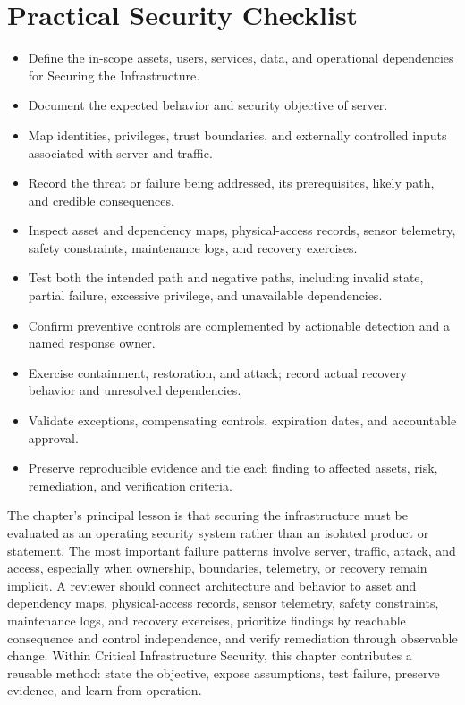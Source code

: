 \documentclass[11pt]{article}
\begin{document}
\section*{Practical Security Checklist}
\begin{itemize}[label=$\square$]
\item Define the in-scope assets, users, services, data, and operational dependencies for Securing the Infrastructure.
\item Document the expected behavior and security objective of server.
\item Map identities, privileges, trust boundaries, and externally controlled inputs associated with server and traffic.
\item Record the threat or failure being addressed, its prerequisites, likely path, and credible consequences.
\item Inspect asset and dependency maps, physical-access records, sensor telemetry, safety constraints, maintenance logs, and recovery exercises.
\item Test both the intended path and negative paths, including invalid state, partial failure, excessive privilege, and unavailable dependencies.
\item Confirm preventive controls are complemented by actionable detection and a named response owner.
\item Exercise containment, restoration, and attack; record actual recovery behavior and unresolved dependencies.
\item Validate exceptions, compensating controls, expiration dates, and accountable approval.
\item Preserve reproducible evidence and tie each finding to affected assets, risk, remediation, and verification criteria.
\end{itemize}
\begin{synthesisbox}
The chapter's principal lesson is that securing the infrastructure must be evaluated as an operating security system rather than an isolated product or statement. The most important failure patterns involve server, traffic, attack, and access, especially when ownership, boundaries, telemetry, or recovery remain implicit. A reviewer should connect architecture and behavior to asset and dependency maps, physical-access records, sensor telemetry, safety constraints, maintenance logs, and recovery exercises, prioritize findings by reachable consequence and control independence, and verify remediation through observable change. Within Critical Infrastructure Security, this chapter contributes a reusable method: state the objective, expose assumptions, test failure, preserve evidence, and learn from operation.
\end{synthesisbox}
\end{document}
